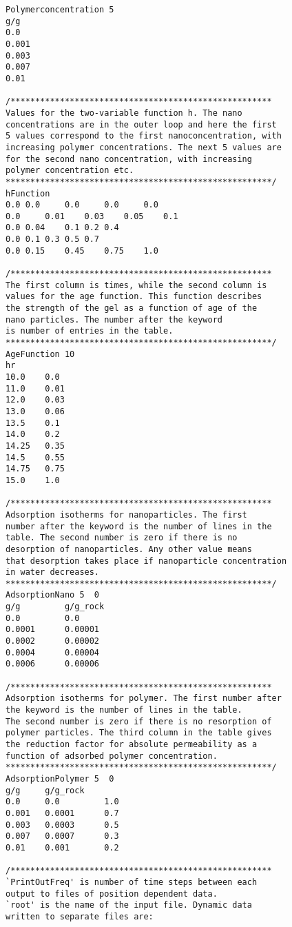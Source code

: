 \begin{appendices}
\begin{lstlisting}
Polymerconcentration 5
g/g
0.0    
0.001  
0.003  
0.007  
0.01   

/*****************************************************
Values for the two-variable function h. The nano 
concentrations are in the outer loop and here the first
5 values correspond to the first nanoconcentration, with
increasing polymer concentrations. The next 5 values are
for the second nano concentration, with increasing 
polymer concentration etc.
******************************************************/
hFunction
0.0	0.0  	0.0  	0.0  	0.0
0.0  	0.01	0.03	0.05	0.1
0.0	0.04	0.1	0.2	0.4
0.0	0.1	0.3	0.5	0.7
0.0	0.15	0.45	0.75	1.0

/*****************************************************
The first column is times, while the second column is 
values for the age function. This function describes 
the strength of the gel as a function of age of the 
nano particles. The number after the keyword 
is number of entries in the table. 
******************************************************/
AgeFunction 10 
hr 
10.0 	0.0
11.0 	0.01
12.0 	0.03
13.0 	0.06
13.5 	0.1
14.0 	0.2
14.25 	0.35
14.5  	0.55
14.75 	0.75
15.0  	1.0

/*****************************************************
Adsorption isotherms for nanoparticles. The first 
number after the keyword is the number of lines in the
table. The second number is zero if there is no 
desorption of nanoparticles. Any other value means
that desorption takes place if nanoparticle concentration
in water decreases.   
******************************************************/
AdsorptionNano 5  0
g/g     	g/g_rock
0.0     	0.0
0.0001  	0.00001
0.0002  	0.00002
0.0004  	0.00004
0.0006  	0.00006

/*****************************************************
Adsorption isotherms for polymer. The first number after
the keyword is the number of lines in the table.
The second number is zero if there is no resorption of 
polymer particles. The third column in the table gives 
the reduction factor for absolute permeability as a 
function of adsorbed polymer concentration.
******************************************************/ 
AdsorptionPolymer 5  0
g/g    	g/g_rock
0.0    	0.0      	1.0
0.001  	0.0001   	0.7
0.003  	0.0003   	0.5
0.007  	0.0007   	0.3
0.01   	0.001    	0.2

/*****************************************************
`PrintOutFreq' is number of time steps between each 
output to files of position dependent data. 
`root' is the name of the input file. Dynamic data 
written to separate files are:


\end{lstlisting}
\end{appendices}
